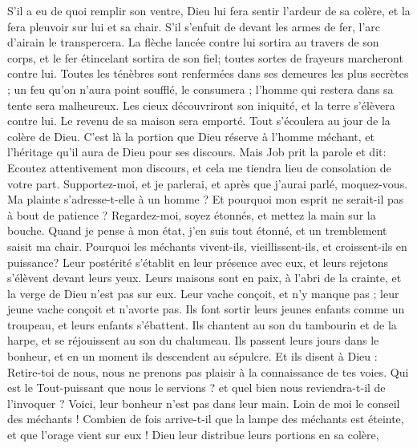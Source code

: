 \begin{multicols}{2}
{S'il a eu de quoi remplir son ventre, Dieu lui fera sentir l'ardeur de sa colère, et la fera pleuvoir sur lui et sa chair.
S’il s’enfuit de devant les armes de fer, l’arc d’airain le transpercera.
La flèche lancée contre lui sortira au travers de son corps, et le fer étincelant sortira de son fiel; toutes sortes de frayeurs marcheront contre lui.
Toutes les ténèbres sont renfermées dans ses demeures les plus secrètes ; un feu qu'on n'aura point soufflé, le consumera ; l'homme qui restera dans sa tente sera malheureux.
Les cieux découvriront son iniquité, et la terre s'élèvera contre lui. 
Le revenu de sa maison sera emporté. Tout s'écoulera au jour de la colère de Dieu.
C'est là la portion que Dieu réserve à l'homme méchant, et l'héritage qu'il aura de Dieu pour ses discours.
\VerseOne{}Mais Job prit la parole et dit: 
Ecoutez attentivement mon discours, et cela me tiendra lieu de consolation de votre part. 
Supportez-moi, et je parlerai, et après que j'aurai parlé, moquez-vous. 
Ma plainte s'adresse-t-elle à un homme ? Et pourquoi mon esprit ne serait-il pas à bout de patience ? 
Regardez-moi, soyez étonnés, et mettez la main sur la bouche.
Quand je pense à mon état, j'en suis tout étonné, et un tremblement saisit ma chair.
Pourquoi les méchants vivent-ils, vieillissent-ils, et croissent-ils en puissance?
Leur postérité s'établit en leur présence avec eux, et leurs rejetons s'élèvent devant leurs yeux.
Leurs maisons sont en paix, à l'abri de la crainte, et la verge de Dieu n'est pas sur eux. 
Leur vache conçoit, et n'y manque pas ; leur jeune vache conçoit et n'avorte pas.
Ils font sortir leurs jeunes enfants comme un troupeau, et leurs enfants s'ébattent. 
Ils chantent au son du tambourin et de la harpe, et se réjouissent au son du chalumeau. 
Ils passent leurs jours dans le bonheur, et en un moment ils descendent au sépulcre. 
Et ils disent à Dieu : Retire-toi de nous, nous ne prenons pas plaisir à la connaissance de tes voies. 
Qui est le Tout-puissant que nous le servions ? et quel bien nous reviendra-t-il de l'invoquer ? 
Voici, leur bonheur n'est pas dans leur main. Loin de moi le conseil des méchants !
Combien de fois arrive-t-il que la lampe des méchants est éteinte, et que l'orage vient sur eux ! Dieu leur distribue leurs portions en sa colère,
}
\end{multicols}

